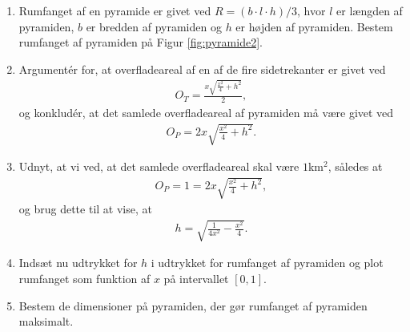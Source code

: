 \begin{enumerate}[label=\roman*)]
\item Rumfanget af en pyramide er givet ved $R = (b\cdot l\cdot h)/3$, hvor $l$ er længden af pyramiden, $b$ er bredden af pyramiden og $h$ er højden af pyramiden. Bestem rumfanget af pyramiden på Figur \ref{fig:pyramide2}.
\item Argumentér for, at overfladeareal af en af de fire sidetrekanter er givet ved 
\begin{align*}
O_T = \frac{x\sqrt{\frac{x^2}{4}+h^2}}{2},
\end{align*}
og konkludér, at det samlede overfladeareal af pyramiden må være givet ved 
\begin{align*}
O_P = 2 x \sqrt{\frac{x^2}{4}+h^2}.
\end{align*}

\item Udnyt, at vi ved, at det samlede overfladeareal skal være $1$km$^2$, således at 
\begin{align*}
O_P = 1 = 2 x \sqrt{\frac{x^2}{4}+h^2},
\end{align*}
og brug dette til at vise, at 
\begin{align*}
h=\sqrt{\frac{1}{4 x^2}-\frac{x^2}{4}}.
\end{align*}

\item Indsæt nu udtrykket for $h$ i udtrykket for rumfanget af pyramiden og plot rumfanget som funktion af $x$ på intervallet $[0,1]$. 
\item Bestem de dimensioner på pyramiden, der gør rumfanget af pyramiden maksimalt.
\end{enumerate}


